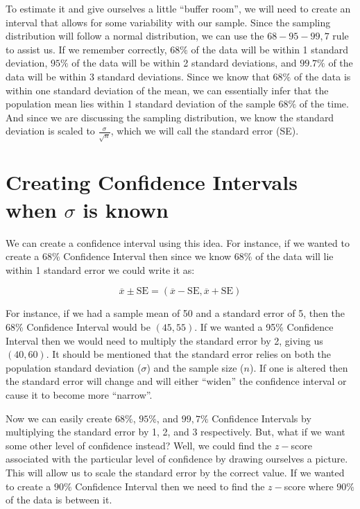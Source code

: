 \documentclass[
  letterpaper,
  DIV=11,
  numbers=noendperiod]{scrreprt}
\begin{document}
To estimate it and give ourselves a little ``buffer room'', we will need
to create an interval that allows for some variability with our sample.
Since the sampling distribution will follow a normal distribution, we
can use the \(68-95-99,7\) rule to assist us. If we remember correctly,
\(68\%\) of the data will be within 1 standard deviation, \(95\%\) of
the data will be within 2 standard deviations, and \(99.7\%\) of the
data will be within 3 standard deviations. Since we know that \(68\%\)
of the data is within one standard deviation of the mean, we can
essentially infer that the population mean lies within 1 standard
deviation of the sample \(68\%\) of the time. And since we are
discussing the sampling distribution, we know the standard deviation is
scaled to \(\frac{\sigma}{\sqrt{n}}\), which we will call the standard
error (SE).

\section{\texorpdfstring{Creating Confidence Intervals when \(\sigma\)
is
known}{Creating Confidence Intervals when \textbackslash sigma is known}}\label{creating-confidence-intervals-when-sigma-is-known}

We can create a confidence interval using this idea. For instance, if we
wanted to create a 68\% Confidence Interval then since we know 68\% of
the data will lie within 1 standard error we could write it as:

\[ \overline{x} \pm \text{SE} = (\overline{x} - \text{SE}, \overline{x} + \text{SE}) \]

For instance, if we had a sample mean of 50 and a standard error of 5,
then the 68\% Confidence Interval would be \((45,55)\). If we wanted a
95\% Confidence Interval then we would need to multiply the standard
error by 2, giving us \((40,60)\). It should be mentioned that the
standard error relies on both the population standard deviation
(\(\sigma\)) and the sample size (\(n\)). If one is altered then the
standard error will change and will either ``widen'' the confidence
interval or cause it to become more ``narrow''.

Now we can easily create \(68\%\), \(95\%\), and \(99,7\%\) Confidence
Intervals by multiplying the standard error by 1, 2, and 3 respectively.
But, what if we want some other level of confidence instead? Well, we
could find the \(z-\)score associated with the particular level of
confidence by drawing ourselves a picture. This will allow us to scale
the standard error by the correct value. If we wanted to create a
\(90\%\) Confidence Interval then we need to find the \(z-\)score where
\(90\%\) of the data is between it.
\end{document}
